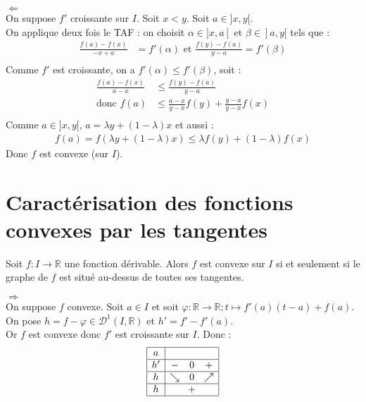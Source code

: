 \documentclass[../main.tex]{subfiles}
\begin{document}
$\boxed{\Leftarrow}$ \\
On suppose $f'$ croissante sur $I$. Soit $x < y$. Soit $a\in ]x, y[$. \\
On applique deux fois le TAF : on choisit $\alpha \in ]x, a[ \text{ et } \beta \in ]a, y[$ tels que :
\begin{align*}
    \frac{f(a) - f(x)}{-x+a} &= f'(\alpha) \text{ et } \frac{f(y) - f(a)}{y-a} = f'(\beta) \\
\end{align*}
Comme $f'$ est croissante, on a $f'(\alpha) \leq f'(\beta)$, soit :
\begin{align*}
    \frac{f(a) - f(x)}{a-x} &\leq \frac{f(y) - f(a)}{y-a} \\
    \text{donc } f(a) &\leq \frac{a-x}{y-x}f(y) + \frac{y-a}{y-x}f(x) \\
\end{align*}
Comme $a \in ]x, y[$, $a = \lambda y + (1-\lambda)x$ et aussi : 
\begin{align*}
    f(a) = f(\lambda y + (1-\lambda)x) \leq \lambda f(y) + (1-\lambda)f(x)
\end{align*}
Donc $f$ est convexe (sur $I$). 

\section{Caractérisation des fonctions convexes par les tangentes}
\begin{tcolorbox}[title=Propostion 19.13, title filled=false, colframe=lightblue, colback=lightblue!10!white]
    Soit $f:I\to \mathbb{R}$ une fonction dérivable. Alors $f$ est convexe sur $I$ si et seulement si le graphe de $f$ est situé au-dessus de toutes ses tangentes. 
\end{tcolorbox}

$\boxed{\Rightarrow}$ \\
On suppose $f$ convexe. Soit $a \in I$ et soit $\varphi:\mathbb{R}\to \mathbb{R}; t\mapsto f'(a)(t-a) + f(a)$. \\
On pose $h = f - \varphi \in \mathcal{D}^1(I, \mathbb{R})$ et $h' = f' - f'(a)$. \\
Or $f$ est convexe donc $f'$ est croissante sur $I$. Donc : 
\begin{align*}
    \begin{array}{|c|ccc|}
        \hline
        a &  &  &  \\
        \hline
        h' & - & 0 & + \\
        \hline
        h & \searrow & 0 & \nearrow \\
        \hline
        h & \multicolumn{3}{c|}{+} \\
        \hline
    \end{array}
\end{align*}
\end{document}
